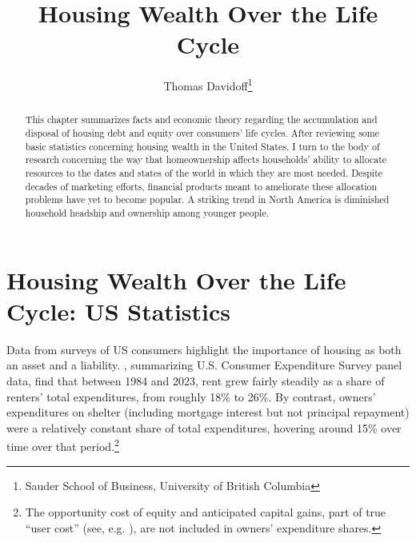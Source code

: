 \documentclass[12pt]{article}
\begin{document}
\title{Housing Wealth Over the Life Cycle}
\author{Thomas Davidoff\thanks{Sauder School of Business, University of British
Columbia}}
\maketitle

\begin{abstract}
This chapter summarizes facts and economic theory regarding the accumulation and
disposal of housing debt and equity over consumers' life cycles.  After
reviewing some basic statistics concerning housing wealth in the United States,
I turn to the body of research concerning the way that homeownership affects
households' ability to allocate resources to the dates and states of the world
in which they are most needed. Despite decades of marketing efforts, financial
products meant to ameliorate these allocation problems have yet to
become popular. A striking trend in North America is diminished household
headship and ownership among younger people. 

\end{abstract}

\section{Housing Wealth Over the Life Cycle: US Statistics}

Data from surveys of US consumers highlight the importance of housing as
both an asset and a liability. \textcite{freddiemac2024homeowner}, summarizing
U.S. Consumer Expenditure Survey panel data, find that between 1984 and 2023,
rent grew fairly steadily as a share of renters' total expenditures, from
roughly 18\% to 26\%. By contrast, owners' expenditures on shelter (including
mortgage interest but not principal repayment) were a relatively constant share
of total expenditures, hovering around 15\% over time over that
period.\footnote{The opportunity cost of equity and anticipated capital gains,
	part of true ``user cost'' (see, e.g.  \textcite{Poterba}), are not
	included in owners' expenditure shares.}
\end{document}
